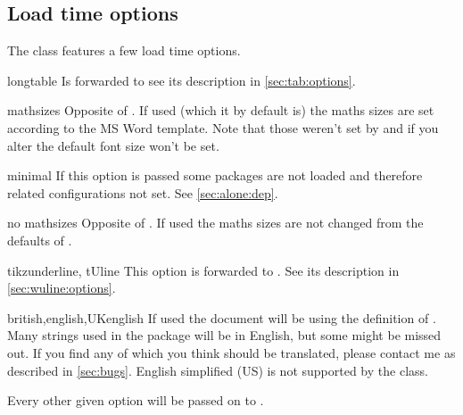 \subsection{Load time options}\label{sec:alone:options}%
The class features a few load time options.
\begin{describeopt}{longtable}
  Is forwarded to  see its description in \autoref{sec:tab:options}.
\end{describeopt}
\begin{describeopt}{mathsizes}
  Opposite of . If used (which it by default is) the maths
  sizes are set according to the MS Word template. Note that those weren't set
  by  and if you alter the default font size won't be set.
\end{describeopt}
\begin{describeopt}{minimal}
  If this option is passed some packages are not loaded and therefore related
  configurations not set. See \autoref{sec:alone:dep}.
\end{describeopt}
\begin{describeopt}{no mathsizes}
  Opposite of . If used the maths sizes are not changed from the
  defaults of .
\end{describeopt}
\begin{describeopt}{tikzunderline, tUline}
  This option is forwarded to . See its description in
  \autoref{sec:wuline:options}.
\end{describeopt}
\begin{describeopt}{british,english,UKenglish}
  If used the document will be using the  definition of
  . Many strings used in the package will be in English, but some
  might be missed out. If you find any of which you think should be translated,
  please contact me as described in \autoref{sec:bugs}. English simplified (US)
  is not supported by the class.
\end{describeopt}


\noindent
Every other given option will be passed on to .
